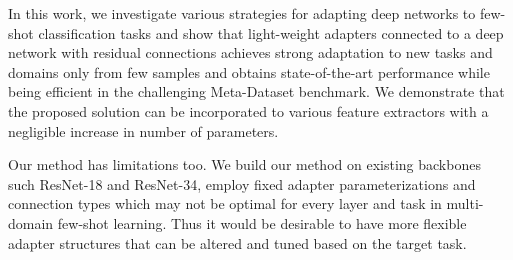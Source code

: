 In this work, we investigate various strategies for adapting deep networks to few-shot classification tasks and show that light-weight adapters connected to a deep network with residual connections achieves strong adaptation to new tasks and domains only from few samples and obtains state-of-the-art performance while being efficient in the challenging Meta-Dataset benchmark. 
We demonstrate that the proposed solution can be incorporated to various feature extractors with a negligible increase in number of parameters.

Our method has limitations too. 
We build our method on existing backbones such ResNet-18 and ResNet-34, employ fixed adapter parameterizations and connection types which may not be optimal for every layer and task in multi-domain few-shot learning. 
Thus it would be desirable to have more flexible adapter structures that can be altered and tuned based on the target task. 

